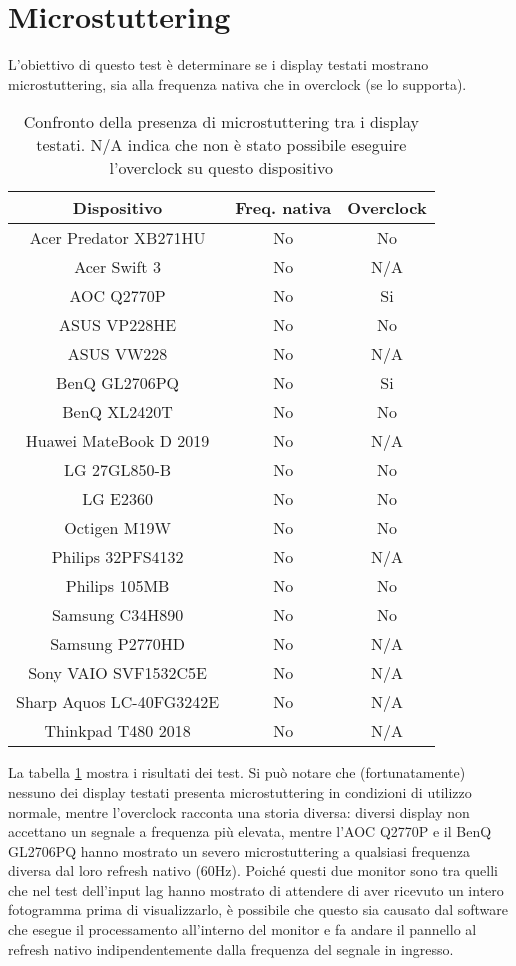 \section{Microstuttering}
L'obiettivo di questo test è determinare se i display testati mostrano microstuttering, sia alla frequenza nativa che in overclock (se lo supporta).

\begin{table}[h!]
	\centering
	\begin{tabular}{|c|c|c|} 
		\hline
		\textbf{Dispositivo} & \textbf{Freq. nativa} & \textbf{Overclock}  \\ 
		\hline
		Acer Predator XB271HU & No & No \\ \hline
		Acer Swift 3 & No & N/A \\ \hline
		AOC Q2770P & No & Si \\ \hline
		ASUS VP228HE & No & No \\ \hline
		ASUS VW228 & No & N/A \\ \hline
		BenQ GL2706PQ & No & Si \\ \hline
		BenQ XL2420T & No & No \\ \hline
		Huawei MateBook D 2019 & No & N/A \\ \hline
		LG 27GL850-B & No & No \\ \hline
		LG E2360 & No & No \\ \hline
		Octigen M19W & No & No \\ \hline
		Philips 32PFS4132 & No & N/A \\ \hline
		Philips 105MB & No & No \\ \hline
		Samsung C34H890 & No & No \\ \hline
		Samsung P2770HD & No & N/A \\ \hline
		Sony VAIO SVF1532C5E & No & N/A \\ \hline
		Sharp Aquos LC-40FG3242E & No & N/A \\ \hline
		Thinkpad T480 2018 & No & N/A \\ \hline
	\end{tabular}
	\caption{\label{tab:microstuttering_list}Confronto della presenza di microstuttering tra i display testati. N/A indica che non è stato possibile eseguire l'overclock su questo dispositivo}
\end{table}

La tabella \ref{tab:microstuttering_list} mostra i risultati dei test. Si può notare che (fortunatamente) nessuno dei display testati presenta microstuttering in condizioni di utilizzo normale, mentre l'overclock racconta una storia diversa: diversi display non accettano un segnale a frequenza più elevata, mentre l'AOC Q2770P e il BenQ GL2706PQ hanno mostrato un severo microstuttering a qualsiasi frequenza diversa dal loro refresh nativo (60Hz). Poiché questi due monitor sono tra quelli che nel test dell'input lag hanno mostrato di attendere di aver ricevuto un intero fotogramma prima di visualizzarlo, è possibile che questo sia causato dal software che esegue il processamento all'interno del monitor e fa andare il pannello al refresh nativo indipendentemente dalla frequenza del segnale in ingresso.
